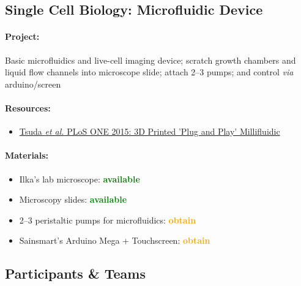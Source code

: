 \documentclass[12pt,a4paper]{scrartcl}
\newcommand{\obtain}[0]{\textcolor{orange}{\textbf{obtain}}}
\newcommand{\avail}[0]{\textcolor{green}{\textbf{available}}}
\begin{document}
\newpage
\subsection{Single Cell Biology: Microfluidic Device} 
\label{micro}

\paragraph{Project:} Basic microfluidics and live-cell imaging device;
scratch growth chambers and liquid flow channels into microscope slide;
attach 2--3 pumps; and control \textit{via} arduino/screen

\paragraph{Resources:}
\begin{itemize}
\item \href{http://www.ncbi.nlm.nih.gov/pmc/articles/PMC4641590/}{Tsuda \textit{et al.} PLoS ONE 2015: 3D Printed 'Plug and Play' Millifluidic}
\end{itemize}

\paragraph{Materials:}
\begin{itemize}
\item Ilka's lab microscope: \avail{}
\item Microscopy slides: \avail{}
\item 2--3 peristaltic pumps for microfluidics: \obtain{}
\item Sainsmart's Arduino Mega + Touchscreen: \obtain{}
\end{itemize}


\newpage

\subsection{Participants \& Teams}
\end{document}
